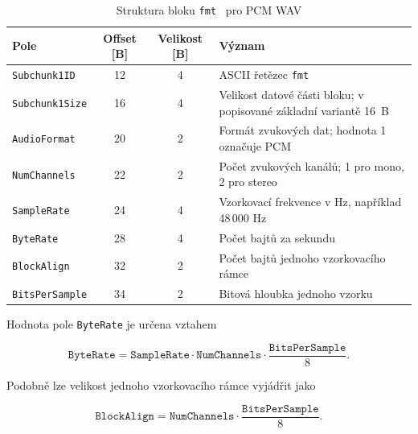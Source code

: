 \begin{table}[ht]
    \centering
    \caption{Struktura bloku \texttt{fmt } pro PCM WAV}
    \label{tab:wav_fmt}
    \begin{tabular}{lccp{7cm}}
        \toprule
        \textbf{Pole} & \textbf{Offset [B]} & \textbf{Velikost [B]} & \textbf{Význam} \\
        \midrule
        \texttt{Subchunk1ID}
        & 12 & 4
        & ASCII řetězec \texttt{fmt } \\

        \texttt{Subchunk1Size}
        & 16 & 4
        & Velikost datové části bloku; v popisované základní variantě 16~B \\

        \texttt{AudioFormat}
        & 20 & 2
        & Formát zvukových dat; hodnota 1 označuje PCM \\

        \texttt{NumChannels}
        & 22 & 2
        & Počet zvukových kanálů; 1 pro mono, 2 pro stereo \\

        \texttt{SampleRate}
        & 24 & 4
        & Vzorkovací frekvence v Hz, například 48\,000 Hz \\

        \texttt{ByteRate}
        & 28 & 4
        & Počet bajtů za sekundu \\

        \texttt{BlockAlign}
        & 32 & 2
        & Počet bajtů jednoho vzorkovacího rámce \\

        \texttt{BitsPerSample}
        & 34 & 2
        & Bitová hloubka jednoho vzorku \\
        \bottomrule
    \end{tabular}
\end{table}

Hodnota pole \texttt{ByteRate} je určena vztahem

\begin{equation}
    \texttt{ByteRate}
    =
    \texttt{SampleRate}
    \cdot
    \texttt{NumChannels}
    \cdot
    \frac{\texttt{BitsPerSample}}{8}.
\end{equation}

Podobně lze velikost jednoho vzorkovacího rámce vyjádřit jako

\begin{equation}
    \texttt{BlockAlign}
    =
    \texttt{NumChannels}
    \cdot
    \frac{\texttt{BitsPerSample}}{8}.
\end{equation}

